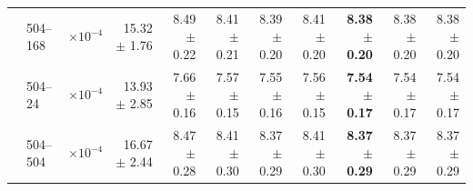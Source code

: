 \begin{table}[htbp]
\begin{tabular}{llcrrrrrrr|r}
 & 504--168 & $\times 10^{-4}$ & 15.32 $\pm$ 1.76 & 8.49 $\pm$ 0.22 & 8.41 $\pm$ 0.21 & 8.39 $\pm$ 0.20 & 8.41 $\pm$ 0.20 & \textbf{8.38 $\pm$ 0.20} & 8.38 $\pm$ 0.20 & 8.38 $\pm$ 0.20 \\
 & 504--24 & $\times 10^{-4}$ & 13.93 $\pm$ 2.85 & 7.66 $\pm$ 0.16 & 7.57 $\pm$ 0.15 & 7.55 $\pm$ 0.16 & 7.56 $\pm$ 0.15 & \textbf{7.54 $\pm$ 0.17} & 7.54 $\pm$ 0.17 & 7.54 $\pm$ 0.17 \\
 & 504--504 & $\times 10^{-4}$ & 16.67 $\pm$ 2.44 & 8.47 $\pm$ 0.28 & 8.41 $\pm$ 0.30 & 8.37 $\pm$ 0.29 & 8.41 $\pm$ 0.30 & \textbf{8.37 $\pm$ 0.29} & 8.37 $\pm$ 0.29 & 8.37 $\pm$ 0.29 \\
\bottomrule
\end{tabular}
\end{table}
